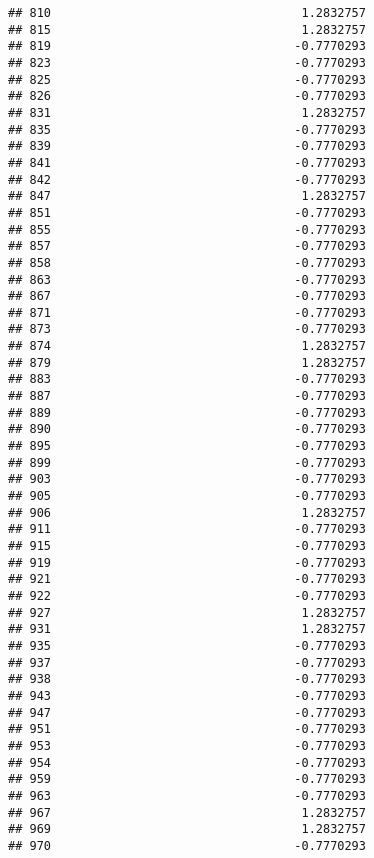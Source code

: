 \documentclass[
]{article}
\begin{document}
\begin{verbatim}
## 810                                   1.2832757
## 815                                   1.2832757
## 819                                  -0.7770293
## 823                                  -0.7770293
## 825                                  -0.7770293
## 826                                  -0.7770293
## 831                                   1.2832757
## 835                                  -0.7770293
## 839                                  -0.7770293
## 841                                  -0.7770293
## 842                                  -0.7770293
## 847                                   1.2832757
## 851                                  -0.7770293
## 855                                  -0.7770293
## 857                                  -0.7770293
## 858                                  -0.7770293
## 863                                  -0.7770293
## 867                                  -0.7770293
## 871                                  -0.7770293
## 873                                  -0.7770293
## 874                                   1.2832757
## 879                                   1.2832757
## 883                                  -0.7770293
## 887                                  -0.7770293
## 889                                  -0.7770293
## 890                                  -0.7770293
## 895                                  -0.7770293
## 899                                  -0.7770293
## 903                                  -0.7770293
## 905                                  -0.7770293
## 906                                   1.2832757
## 911                                  -0.7770293
## 915                                  -0.7770293
## 919                                  -0.7770293
## 921                                  -0.7770293
## 922                                  -0.7770293
## 927                                   1.2832757
## 931                                   1.2832757
## 935                                  -0.7770293
## 937                                  -0.7770293
## 938                                  -0.7770293
## 943                                  -0.7770293
## 947                                  -0.7770293
## 951                                  -0.7770293
## 953                                  -0.7770293
## 954                                  -0.7770293
## 959                                  -0.7770293
## 963                                  -0.7770293
## 967                                   1.2832757
## 969                                   1.2832757
## 970                                  -0.7770293

\end{verbatim}
\end{document}
